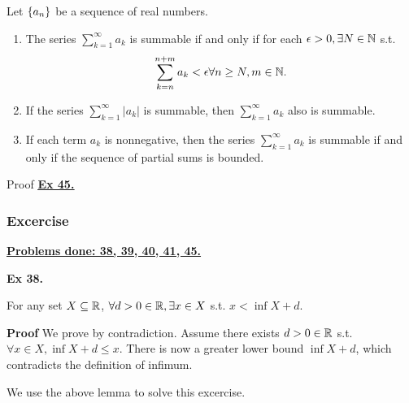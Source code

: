 \begin{prop}
    Let $\left\{a_n\right\}$ be a sequence of real numbers.
    \begin{enumerate}[label=(\roman*)]
        \item The series $\sum_{k=1}^\infty a_k$ is summable if and only if for each $\epsilon > 0, \exists N\in\mathbb{N}$ s.t.
        \[ \sum_{k=n}^{n+m} a_k < \epsilon \forall n \ge N, m \in \mathbb{N}.\]
        \item If the series $\sum_{k=1}^\infty |a_k|$ is summable, then $\sum_{k=1}^\infty a_k$ also is summable.
        \item If each term $a_k$ is nonnegative, then the series $\sum_{k=1}^\infty a_k$ is summable if and only if the sequence of partial sums is bounded.
    \end{enumerate}
    Proof \hyperref[ex:45]{\underline{\textbf{Ex 45.}}}
\end{prop}

\subsubsection{Excercise}
\underline{\textbf{Problems done: 38, 39, 40, 41, 45.}}
\bigskip

\noindent \textbf{Ex 38.}
\begin{lem}
    For any set $X\subseteq \mathbb{R}$, $\forall d > 0 \in \mathbb{R}, \exists x \in X$ s.t. $x < \inf X + d$.
\end{lem}

\textbf{Proof} We prove by contradiction. Assume there exists $d > 0 \in \mathbb{R}$ s.t. 
$\forall x \in X, \inf X + d \leq x$. There is now a greater lower bound $\inf X + d$, which contradicts the definition of infimum.

\bigskip

\noindent We use the above lemma to solve this excercise.

